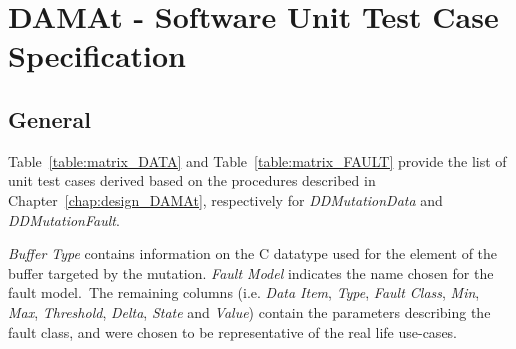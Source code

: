 
\chapter{DAMAt - Software Unit Test Case Specification}
\label{chap:spec_DAMAt}

\section{General}

Table~\ref{table:matrix_DATA} and Table~\ref{table:matrix_FAULT} provide the list of unit test cases derived based on the procedures described in Chapter~\ref{chap:design_DAMAt}, respectively for \emph{DDMutationData} and \emph{DDMutationFault}.

\emph{Buffer Type} contains information on the C datatype used for the element of the buffer targeted by the mutation.
\emph{Fault Model} indicates the name chosen for the fault model.\
The remaining columns (i.e. \emph{Data Item}, \emph{Type}, \emph{Fault Class}, \emph{Min}, \emph{Max}, \emph{Threshold}, \emph{Delta}, \emph{State}  and \emph{Value}) contain the parameters describing the fault class, and were chosen to be representative of the real life use-cases.




